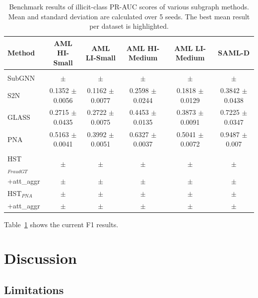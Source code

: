 \documentclass[12pt, twocolumn]{report}
\begin{document}
\begin{table}[t]
    \centering
    \caption{Benchmark results of illicit-class PR-AUC scores of various subgraph methods. Mean and standard deviation are calculated over 5 seeds. The best mean result per dataset is \textcolor{OliveGreen}{highlighted}.}
    \vspace{0.2cm}

    \begin{tabular}{>{\footnotesize}l >{\footnotesize}c >{\footnotesize}c >{\footnotesize}c >{\footnotesize}c >{\footnotesize}c}
        \hline
        {Method} & AML HI-Small & AML LI-Small & AML HI-Medium & AML LI-Medium & SAML-D \\
        \hline\\[-2.3ex]
        SubGNN & $\pm$ & $\pm$ & $\pm$ & $\pm$ & $\pm$ \\
        S2N & 0.1352 $\pm$ 0.0056 & 0.1162 $\pm$ 0.0077 & 0.2598 $\pm$ 0.0244 & 0.1818 $\pm$ 0.0129 & 0.3842 $\pm$ 0.0438 \\
        GLASS & 0.2715 $\pm$ 0.0435 & 0.2722 $\pm$ 0.0075 & 0.4453 $\pm$ 0.0135 & 0.3873 $\pm$ 0.0091 & 0.7225 $\pm$ 0.0347 \\
        PNA & 0.5163 $\pm$ 0.0041 & 0.3992 $\pm$ 0.0051 & 0.6327 $\pm$ 0.0037 & 0.5041 $\pm$ 0.0072 & 0.9487 $\pm$ 0.007 \\

        \hline\\[-2.3ex]

        HST$_{FraudGT}$ & $\pm$ & $\pm$ & $\pm$ & $\pm$ & $\pm$ \\
        \quad +att\_aggr & $\pm$ & $\pm$ & $\pm$ & $\pm$ & $\pm$ \\
        HST$_{PNA}$ & $\pm$ & $\pm$ & $\pm$ & $\pm$ & $\pm$ \\
        \quad +att\_aggr & $\pm$ & $\pm$ & $\pm$ & $\pm$ & $\pm$ \\

        \hline
    \end{tabular}

    \label{tab:main-results}
\end{table}


Table~\ref{tab:main-results} shows the current F1 results.


\chapter{Discussion}



\section{Limitations}
\end{document}
